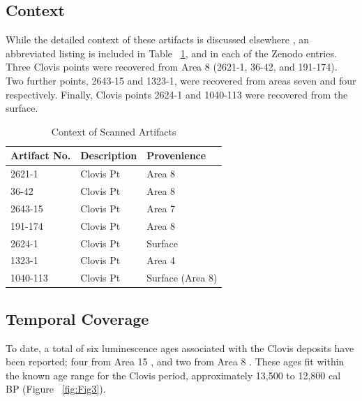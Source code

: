 \documentclass[preprint,12pt]{elsarticle}
\begin{document}
\subsection{Context}
While the detailed context of these artifacts is discussed elsewhere \cite{Collins2002,Collins2007,Bradley2010,Rodrigues2016,Speer2014,Waters2011}, an abbreviated listing is included in Table ~\ref{tab:Tbl1}, and in each of the Zenodo entries. Three Clovis points were recovered from Area 8 (2621-1, 36-42, and 191-174). Two further points, 2643-15 and 1323-1, were recovered from areas seven and four respectively. Finally, Clovis points 2624-1 and 1040-113 were recovered from the surface.

\begin{table}[tbh]\centering
\caption{Context of Scanned Artifacts}
\centering
\begin{tabular}{lll}
\hline
Artifact No. & Description & Provenience \\
\hline
2621-1 & Clovis Pt & Area 8\\
36-42 & Clovis Pt & Area 8\\
2643-15 & Clovis Pt & Area 7\\
191-174 & Clovis Pt & Area 8\\
2624-1 & Clovis Pt & Surface\\
1323-1 & Clovis Pt & Area 4\\
1040-113 & Clovis Pt & Surface (Area 8)\\
\hline
\end{tabular}
\label{tab:Tbl1}
\end{table}

\subsection{Temporal Coverage} 

To date, a total of six luminescence ages associated with the Clovis deposits have been reported; four from Area 15 \cite{Rodrigues2016}, and two from Area 8 \cite{Waters2011}. These ages fit within the known age range for the Clovis period, approximately 13,500 to 12,800 cal BP \cite{Holliday2000,Meltzer2009} (Figure ~\ref{fig:Fig3}). 
\end{document}
